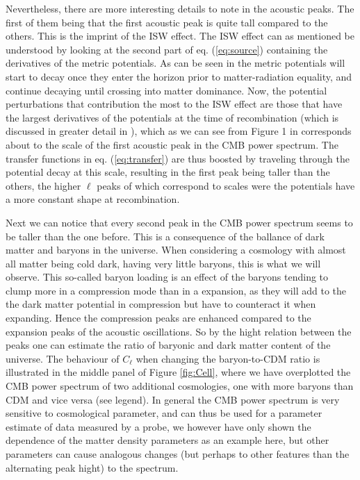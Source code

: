\documentclass[twocolumn]{aastex62}
\begin{document}
Nevertheless, there are more interesting details to note in the acoustic peaks. The first of them being that the first acoustic peak is quite tall compared to the others. This is the imprint of the ISW effect. The ISW effect can as mentioned be understood by looking at the second part of eq. (\ref{eq:source}) containing the derivatives of the metric potentials. As can be seen in \cite{stutzer:2020c} the metric potentials will start to decay once they enter the horizon prior to matter-radiation equality, and continue decaying until crossing into matter dominance. Now, the potential perturbations that contribution the most to the ISW effect are those that have the largest derivatives of the potentials at the time of recombination (which is discussed in greater detail in \cite{dodelson:2003}), which as we can see from Figure 1 in \cite{stutzer:2020c} corresponds about to the scale of the first acoustic peak in the CMB power spectrum. The transfer functions in eq. (\ref{eq:transfer}) are thus boosted by traveling through the potential decay at this scale, resulting in the first peak being taller than the others, the higher $\ell$ peaks of which correspond to scales were the potentials have a more constant shape at recombination.

Next we can notice that every second peak in the CMB power spectrum seems to be taller than the one before. This is a consequence of the ballance of dark matter and baryons in the universe. When considering a cosmology with almost all matter being cold dark, having very little baryons, this is what we will observe. This so-called baryon loading is an effect of the baryons tending to clump more in a compression mode than in a expansion, as they will add to the the dark matter potential in compression but have to counteract it when expanding. Hence the compression peaks are enhanced compared to the expansion peaks of the acoustic oscillations. So by the hight relation between the peaks one can estimate the ratio of baryonic and dark matter content of the universe. The behaviour of $C_\ell$ when changing the baryon-to-CDM ratio is illustrated in the middle panel of Figure \ref{fig:Cell}, where we have overplotted the CMB power spectrum of two additional cosmologies, one with more baryons than CDM and vice versa (see legend). In general the CMB power spectrum is very sensitive to cosmological parameter, and can thus be used for a parameter estimate of data measured by a probe, we however have only shown the dependence of the matter density parameters as an example here, but other parameters can cause analogous changes (but perhaps to other features than the alternating peak hight) to the spectrum.
\end{document}
